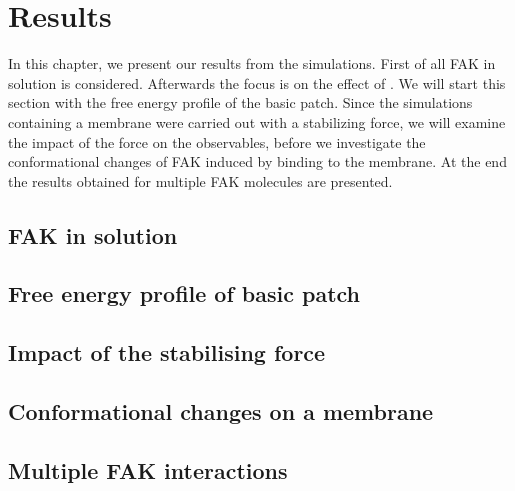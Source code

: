 \chapter{Results}
In this chapter, we present our results from the simulations. First of all FAK in solution is considered. Afterwards the focus is on the effect of \pip{}. We will start this section with the free energy profile of the basic patch. Since the simulations containing a membrane were carried out with a stabilizing force, we will examine the impact of the force on the observables, before we investigate the conformational changes of FAK induced by binding to the membrane. At the end the results obtained for multiple FAK molecules are presented.
%
%
\section{FAK in solution}

\clearpage
%
%
\section{Free energy profile of basic patch}

\clearpage
%
%
\section{Impact of the stabilising force}

\clearpage
%
%
\section{Conformational changes on a membrane}

\clearpage
%
%
\section{Multiple FAK interactions}
